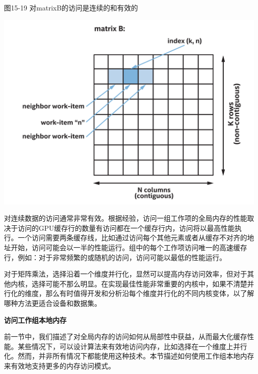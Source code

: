 \hspace*{\fill} \par %
图15-19 对matrixB的访问是连续的和有效的
\begin{center}
	\includegraphics[width=1.0\textwidth]{content/chapter-15/images/14}
\end{center}

对连续数据的访问通常非常有效。根据经验，访问一组工作项的全局内存的性能取决于访问的GPU缓存行的数量有访问都在一个缓存行内，访问将以最高性能执行。一个访问需要两条缓存线，比如通过访问每个其他元素或者从缓存不对齐的地址开始，访问可能会以一半的性能运行。组中的每个工作项访问唯一的高速缓存行，例如：对于非常频繁的或随机的访问，访问可能以最低的性能运行。\par

\begin{tcolorbox}[colback=blue!5!white,colframe=blue!75!black, title=设置内核变体]
对于矩阵乘法，选择沿着一个维度并行化，显然可以提高内存访问效率，但对于其他内核，选择可能不那么明显。在实现最佳性能非常重要的内核中，如果不清楚并行化的维度，那么有时值得开发和分析沿每个维度并行化的不同内核变体，以了解哪种方法更适合设备和数据集。
\end{tcolorbox}

\hspace*{\fill} \par %
\textbf{访问工作组本地内存}

前一节中，我们描述了对全局内存的访问如何从局部性中获益，从而最大化缓存性能。某些情况下，可以设计算法来有效地访问内存，比如选择在一个维度上并行化。然而，并非所有情况下都能使用这种技术。本节描述如何使用工作组本地内存来有效地支持更多的内存访问模式。\par

